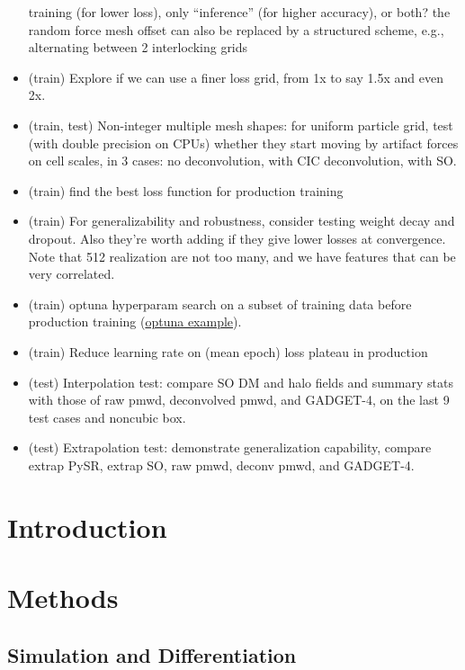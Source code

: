 \documentclass[usenatbib]{mnras}
\newcommand{\GADGET}{{{\fontsize{7.7pt}{9pt}\selectfont GADGET}-4}}
\begin{document}
\begin{itemize}
  training (for lower loss), only ``inference'' (for higher accuracy),
  or both? the random force mesh offset can also be replaced by a
  structured scheme, e.g., alternating between 2 interlocking grids
\item (train) Explore if we can use a finer loss grid, from 1x to say
  1.5x and even 2x.
\item (train, test) Non-integer multiple mesh shapes: for uniform
  particle grid, test (with double precision on CPUs) whether they start
  moving by artifact forces on cell scales, in 3 cases: no
  deconvolution, with CIC deconvolution, with SO.
\item (train) find the best loss function for production training
\item (train) For generalizability and robustness, consider testing
  weight decay and dropout. Also they're worth adding if they give lower
  losses at convergence. Note that 512 realization are not too many, and
  we have features that can be very correlated.
\item (train) optuna hyperparam search on a subset of training data
  before production training
  (\href{https://github.com/optuna/optuna-examples/blob/main/haiku/haiku_simple.py}{optuna example}).
\item (train) Reduce learning rate on (mean epoch) loss plateau in
  production
\item (test) Interpolation test: compare SO DM and halo fields and
  summary stats with those of raw pmwd, deconvolved pmwd, and \GADGET,
  on the last 9 test cases and noncubic box.
\item (test) Extrapolation test: demonstrate generalization capability,
  compare extrap PySR, extrap SO, raw pmwd, deconv pmwd, and \GADGET.
\end{itemize}


\section{Introduction}


\section{Methods}


\subsection{Simulation and Differentiation}
\end{document}
